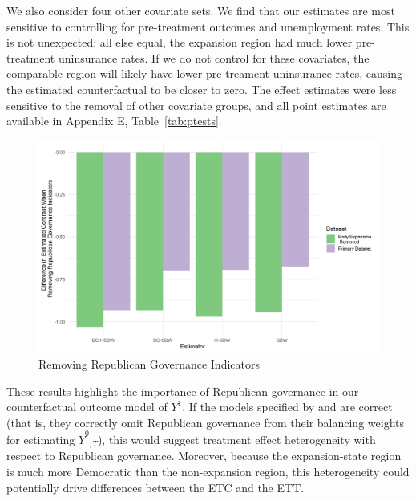 \documentclass[article]{imsart}
\theoremstyle{plain}
\theoremstyle{remark}
\begin{document}
We also consider four other covariate sets. We find that our estimates are most sensitive to controlling for pre-treatment outcomes and unemployment rates. This is not unexpected: all else equal, the expansion region had much lower pre-treatment uninsurance rates. If we do not control for these covariates, the comparable region will likely have lower pre-treament uninsurance rates, causing the estimated counterfactual to be closer to zero. The effect estimates were less sensitive to the removal of other covariate groups, and all point estimates are available in Appendix E, Table~\ref{tab:ptests}.

\begin{figure}[H]
\begin{center}
    \caption{Removing Republican Governance Indicators}
    \label{fig:repub}
    \includegraphics[scale=0.6]{01_Plots/repub-diff-all-estimators.png}
\end{center}
\end{figure}

These results highlight the importance of Republican governance in our counterfactual outcome model of $Y^1$. If the models specified by \cite{kaestner2017effects} and \cite{courtemanche2017early} are correct (that is, they correctly omit Republican governance from their balancing weights for estimating $\bar{Y}^0_{1, T}$), this would suggest treatment effect heterogeneity with respect to Republican governance. Moreover, because the expansion-state region is much more Democratic than the non-expansion region, this heterogeneity could potentially drive differences between the ETC and the ETT.
\end{document}
